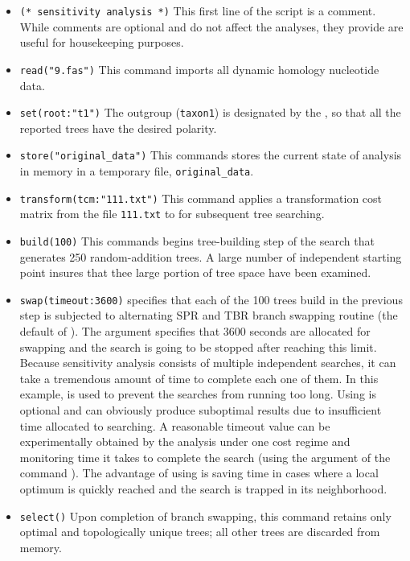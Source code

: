 \begin{itemize}
\item \texttt{(* sensitivity analysis *)} This first line of the script is a comment. While comments are optional and do not affect the analyses, they provide are useful for housekeeping purposes.
\item \texttt{read("9.fas")} This command imports all dynamic homology nucleotide data.
\item \texttt{set(root:"t1")} The outgroup (\texttt{taxon1}) is designated by the , so that all the reported trees have the desired polarity.
\item \texttt{store("original\_data")} This commands stores the current state of analysis in memory in a temporary file, \texttt{original\_data}.
\item \texttt{transform(tcm:"111.txt")} This command applies a transformation cost matrix from the file \texttt{111.txt} to for subsequent tree searching.
\item \texttt{build(100)} This commands begins tree-building step of the search that generates 250 random-addition trees. A large number of independent starting point insures that thee large portion of tree space have been examined.
\item \texttt{swap(timeout:3600)}  specifies that each of the 100 trees build in the previous step is subjected to alternating SPR and TBR branch swapping routine (the default of \poy). The argument  specifies that 3600 seconds are allocated for swapping and the search is going to be stopped after reaching this limit. Because sensitivity analysis consists of multiple independent searches, it can take a tremendous amount of time to complete each one of them. In this example,  is used to prevent the searches from running too long. Using  is optional and can obviously produce suboptimal results due to insufficient time allocated to searching. A reasonable timeout value can be experimentally obtained by the analysis under one cost regime and monitoring time it takes to complete the search (using the argument  of the command ). The advantage of using  is saving time in cases where a local optimum is quickly reached and the search is trapped in its neighborhood.
\item \texttt{select()} Upon completion of branch swapping, this command retains only optimal and topologically unique trees; all other trees are discarded from memory.

\end{itemize}
